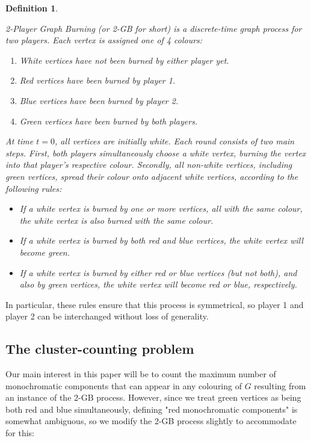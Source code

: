 \documentclass{mpaper}
\newtheorem{definition}[theorem]{Definition}
\begin{document}
\begin{definition}
\label{def/2-GB}

2-Player Graph Burning (or 2-GB for short) is a discrete-time graph process for two players. Each vertex is assigned one of 4 colours:

\begin{enumerate}
  \item \emph{White} vertices have not been burned by either player yet.
  \item \emph{Red} vertices have been burned by player 1.
  \item \emph{Blue} vertices have been burned by player 2.
  \item \emph{Green} vertices have been burned by \emph{both} players.
\end{enumerate}

At time $t=0$, all vertices are initially white. Each round consists of two main steps. First, both players simultaneously choose a white vertex, burning the vertex into that player's respective colour. Secondly, all non-white vertices, including green vertices, spread their colour onto adjacent white vertices, according to the following rules:

\begin{itemize}
  \item If a white vertex is burned by one or more vertices, all with the same colour, the white vertex is also burned with the same colour.
  \item If a white vertex is burned by both red and blue vertices, the white vertex will become green.
  \item If a white vertex is burned by either red or blue vertices (but not both), and also by green vertices, the white vertex will become red or blue, respectively. 
\end{itemize}

\end{definition}

In particular, these rules ensure that this process is symmetrical, so player 1 and player 2 can be interchanged without loss of generality.

\subsection{The cluster-counting problem}

Our main interest in this paper will be to count the maximum number of monochromatic components that can appear in any colouring of $G$ resulting from an instance of the 2-GB process. However, since we treat green vertices as being both red and blue simultaneously, defining "red monochromatic components" is somewhat ambiguous, so we modify the 2-GB process slightly to accommodate for this:
\end{document}
